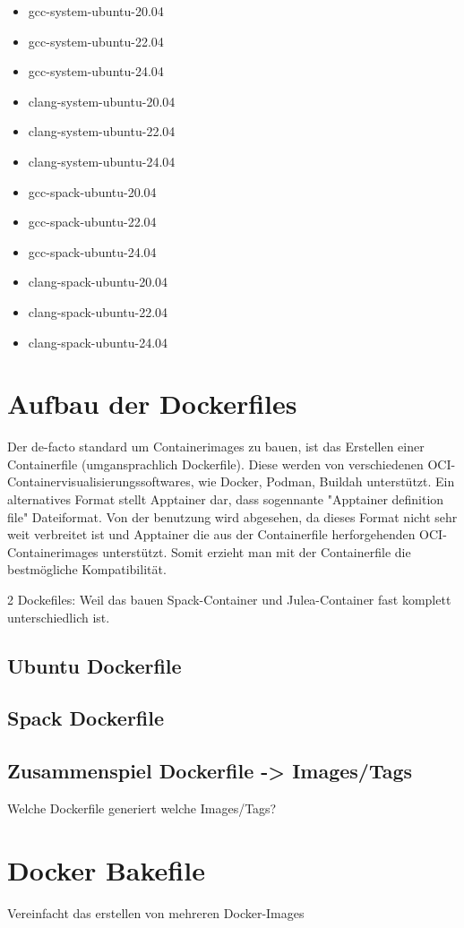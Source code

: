 \begin{itemize}
    \item gcc-system-ubuntu-20.04  
    \item gcc-system-ubuntu-22.04  
    \item gcc-system-ubuntu-24.04  
    \item clang-system-ubuntu-20.04
    \item clang-system-ubuntu-22.04
    \item clang-system-ubuntu-24.04
    \item gcc-spack-ubuntu-20.04   
    \item gcc-spack-ubuntu-22.04   
    \item gcc-spack-ubuntu-24.04   
    \item clang-spack-ubuntu-20.04 
    \item clang-spack-ubuntu-22.04 
    \item clang-spack-ubuntu-24.04 
\end{itemize}

\section{Aufbau der Dockerfiles}

Der de-facto standard um Containerimages zu bauen, ist das Erstellen einer Containerfile (umgansprachlich Dockerfile). Diese werden von verschiedenen OCI-Containervisualisierungssoftwares, wie Docker, Podman, Buildah unterstützt. Ein alternatives Format stellt Apptainer dar, dass sogennante "Apptainer definition file" Dateiformat. Von der benutzung wird abgesehen, da dieses Format nicht sehr weit verbreitet ist und Apptainer die aus der Containerfile herforgehenden OCI-Containerimages unterstützt. Somit erzieht man mit der Containerfile die bestmögliche Kompatibilität. 


2 Dockefiles: Weil das bauen Spack-Container und Julea-Container fast komplett unterschiedlich ist.

\subsection{Ubuntu Dockerfile}

\subsection{Spack Dockerfile}

\subsection{Zusammenspiel Dockerfile -> Images/Tags}
Welche Dockerfile generiert welche Images/Tags?

\section{Docker Bakefile}

Vereinfacht das erstellen von mehreren Docker-Images